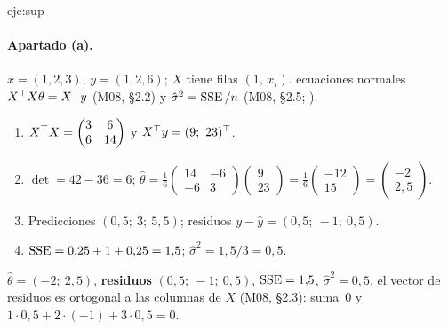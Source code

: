 \begin{solucion}{eje:sup}
\paragraph{Apartado (a).}
\datos $x=(1,2,3)$, $y=(1,2,6)$; $X$ tiene filas $(1,\,x_i)$.
\planteamiento ecuaciones normales $X^{\top} X\theta=X^{\top} y$ (M08, §2.2) y $\hat\sigma^{2}=\operatorname{SSE}/n$ (M08, §2.5; \cite[§1.3]{cs229}).
\pasos
\begin{enumerate}[label=\arabic*.]
  \item $X^{\top} X=\begin{pmatrix}3&6\\6&14\end{pmatrix}$ y $X^{\top} y=(9;\allowbreak\ 23)^{\top}$.
  \item $\det=42-36=6$; $\hat\theta=\tfrac16\begin{pmatrix}14&-6\\-6&3\end{pmatrix}\begin{pmatrix}9\\23\end{pmatrix}=\tfrac16\begin{pmatrix}-12\\15\end{pmatrix}=\begin{pmatrix}-2\\2{,}5\end{pmatrix}$.
  \item Predicciones $(0{,}5;\allowbreak\ 3;\allowbreak\ 5{,}5)$; residuos $y-\hat y=(0{,}5;\allowbreak\ -1;\allowbreak\ 0{,}5)$.
  \item $\operatorname{SSE}=0{,}25+1+0{,}25=1{,}5$; $\hat\sigma^{2}=1{,}5/3=0{,}5$.
\end{enumerate}
\resultado $\hat\theta=(-2;\allowbreak\ 2{,}5)$, \textbf{residuos} $(0{,}5;\allowbreak\ -1;\allowbreak\ 0{,}5)$, $\operatorname{SSE}=1{,}5$, $\hat\sigma^{2}=0{,}5$.
\comprobacion el vector de residuos es ortogonal a las columnas de $X$ (M08, §2.3): suma~0 y $1\cdot 0{,}5+2\cdot(-1)+3\cdot 0{,}5=0$.


\end{solucion}
